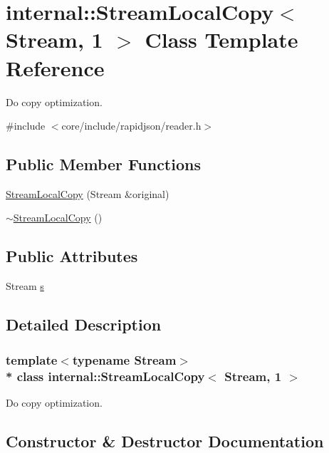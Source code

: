 \hypertarget{classinternal_1_1StreamLocalCopy_3_01Stream_00_011_01_4}{}\section{internal\+:\+:Stream\+Local\+Copy$<$ Stream, 1 $>$ Class Template Reference}
\label{classinternal_1_1StreamLocalCopy_3_01Stream_00_011_01_4}


Do copy optimization.  




{\ttfamily \#include $<$core/include/rapidjson/reader.\+h$>$}

\subsection*{Public Member Functions}
\begin{DoxyCompactItemize}
\item 
\hyperlink{classinternal_1_1StreamLocalCopy_3_01Stream_00_011_01_4_aba475fed3eecc9f77ff059fdb7fe2a32}{Stream\+Local\+Copy} (Stream \&original)
\item 
\hyperlink{classinternal_1_1StreamLocalCopy_3_01Stream_00_011_01_4_ac13d9994e6c828536fedf698f5824687}{$\sim$\+Stream\+Local\+Copy} ()
\end{DoxyCompactItemize}
\subsection*{Public Attributes}
\begin{DoxyCompactItemize}
\item 
Stream \hyperlink{classinternal_1_1StreamLocalCopy_3_01Stream_00_011_01_4_a1d3e8ae8756325df25715d4ffb9c1b44}{s}
\end{DoxyCompactItemize}


\subsection{Detailed Description}
\subsubsection*{template$<$typename Stream$>$\\*
class internal\+::\+Stream\+Local\+Copy$<$ Stream, 1 $>$}

Do copy optimization. 

\subsection{Constructor \& Destructor Documentation}
